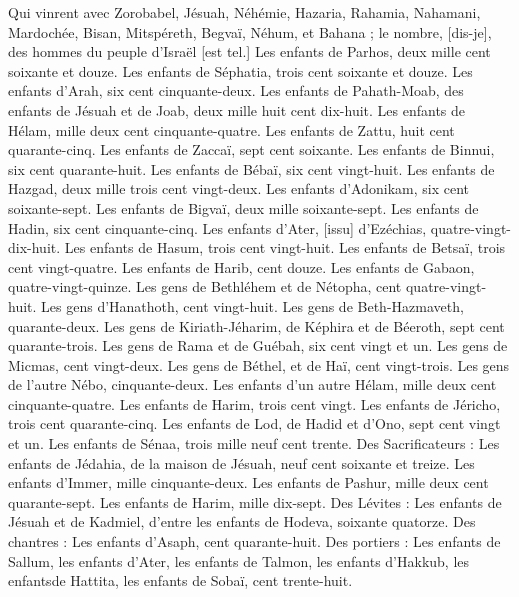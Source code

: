 \begin{multicols}{2}
Qui vinrent avec Zorobabel, Jésuah, Néhémie, Hazaria, Rahamia, Nahamani, Mardochée, Bisan, Mitspéreth, Begvaï, Néhum, et Bahana ; le nombre, [dis-je], des hommes du peuple d'Israël [est tel.]
Les enfants de Parhos, deux mille cent soixante et douze.
Les enfants de Séphatia, trois cent soixante et douze.
Les enfants d'Arah, six cent cinquante-deux.
Les enfants de Pahath-Moab, des enfants de Jésuah et de Joab, deux mille huit cent dix-huit.
Les enfants de Hélam, mille deux cent cinquante-quatre.
Les enfants de Zattu, huit cent quarante-cinq.
Les enfants de Zaccaï, sept cent soixante.
Les enfants de Binnui, six cent quarante-huit.
Les enfants de Bébaï, six cent vingt-huit.
Les enfants de Hazgad, deux mille trois cent vingt-deux.
Les enfants d'Adonikam, six cent soixante-sept.
Les enfants de Bigvaï, deux mille soixante-sept.
Les enfants de Hadin, six cent cinquante-cinq.
Les enfants d'Ater, [issu] d'Ezéchias, quatre-vingt-dix-huit.
Les enfants de Hasum, trois cent vingt-huit.
Les enfants de Betsaï, trois cent vingt-quatre.
Les enfants de Harib, cent douze.
Les enfants de Gabaon, quatre-vingt-quinze.
Les gens de Bethléhem et de Nétopha, cent quatre-vingt-huit.
Les gens d'Hanathoth, cent vingt-huit.
Les gens de Beth-Hazmaveth, quarante-deux.
Les gens de Kiriath-Jéharim, de Képhira et de Béeroth, sept cent quarante-trois.
Les gens de Rama et de Guébah, six cent vingt et un.
Les gens de Micmas, cent vingt-deux.
Les gens de Béthel, et de Haï, cent vingt-trois.
Les gens de l'autre Nébo, cinquante-deux.
Les enfants d'un autre Hélam, mille deux cent cinquante-quatre.
Les enfants de Harim, trois cent vingt.
Les enfants de Jéricho, trois cent quarante-cinq.
Les enfants de Lod, de Hadid et d'Ono, sept cent vingt et un.
Les enfants de Sénaa, trois mille neuf cent trente.
Des Sacrificateurs : Les enfants de Jédahia, de la maison de Jésuah, neuf cent soixante et treize.
Les enfants d'Immer, mille cinquante-deux.
Les enfants de Pashur, mille deux cent quarante-sept.
Les enfants de Harim, mille dix-sept.
Des Lévites : Les enfants de Jésuah et de Kadmiel, d'entre les enfants de Hodeva, soixante quatorze.
Des chantres : Les enfants d'Asaph, cent quarante-huit.
Des portiers : Les enfants de Sallum, les enfants d'Ater, les enfants de Talmon, les enfants d'Hakkub, les enfantsde Hattita, les enfants de Sobaï, cent trente-huit.

\end{multicols}
